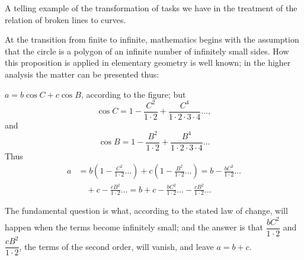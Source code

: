 \documentclass[12pt]{book}
\begin{document}
A telling example of the transformation of tasks we have in the treatment of the
relation of broken lines to curves.

At the transition from finite to infinite, mathematics begins with the assumption
that the circle is a polygon of an infinite number of infinitely small sides. How
this proposition is applied in elementary geometry is well known; in the higher
analysis the matter can be presented thus:

\begin{center}
\end{center}

$a = b\cos C + c\cos B$, according to the figure; but
\[
\cos C = 1 - \frac{C^{2}}{1\cdot2} + \frac{C^{4}}{1\cdot2\cdot3\cdot4} \dots,
\]
and
\[
\cos B = 1 - \frac{B^{2}}{1\cdot2} + \frac{B^{4}}{1\cdot2\cdot3\cdot4} \dots
\]
Thus
\[
\begin{aligned}
a &= b\left(1 - \frac{C^{2}}{1\cdot2} \dots\right)
+ c\left(1 - \frac{B^{2}}{1\cdot2} \dots\right)
= b - \frac{bC^{2}}{1\cdot2}\dots\\
&\quad {}+ c - \frac{cB^{2}}{1\cdot2}\dots
= b + c - \frac{bC^{2}}{1\cdot2}\dots - \frac{cB^{2}}{1\cdot2}\dots
\end{aligned}
\]

The fundamental question is what, according to the stated law of change, will happen
when the terms become infinitely small; and the answer is that $\dfrac{bC^{2}}{1\cdot2}$
and $\dfrac{cB^{2}}{1\cdot2}$, the terms of the second order, will vanish, and leave
$a = b + c$.
\end{document}
